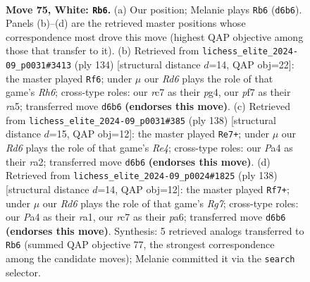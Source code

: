 \documentclass[11pt]{article}
\begin{document}
\clearpage

\begin{figure}[p]\centering
\begin{subfigure}{0.46\textwidth}\centering
\resizebox{\linewidth}{!}{%
\newchessgame
\chessboard[
  setfen={R7/2r2p2/3Rp3/6k1/P3P3/5P2/6K1/8 w - - 41 75},
  showmover=false,
  pgfstyle=straightmove, color=movearrow, markmove={d6-b6}
]}
\caption{}
\end{subfigure}\hfill
\begin{subfigure}{0.46\textwidth}\centering
\resizebox{\linewidth}{!}{%
\newchessgame
\chessboard[
  setfen={8/2k5/7R/r6p/6p1/6P1/5PK1/8 w - - 14 68},
  showmover=false,
  pgfstyle=straightmove, color=movearrow, markmove={h6-f6}
]}
\caption{}
\end{subfigure}
\\[4pt]
\begin{subfigure}{0.46\textwidth}\centering
\resizebox{\linewidth}{!}{%
\newchessgame
\chessboard[
  setfen={8/7k/8/7p/4R2P/6P1/r3pK2/8 w - - 1 70},
  showmover=false,
  pgfstyle=straightmove, color=movearrow, markmove={e4-e7}
]}
\caption{}
\end{subfigure}\hfill
\begin{subfigure}{0.46\textwidth}\centering
\resizebox{\linewidth}{!}{%
\newchessgame
\chessboard[
  setfen={8/6R1/pp6/5kp1/2PK4/7P/7P/r7 w - - 7 70},
  showmover=false,
  pgfstyle=straightmove, color=movearrow, markmove={g7-f7}
]}
\caption{}
\end{subfigure}
\caption{\textbf{Move 75, White: \texttt{Rb6}.} (a) Our position; Melanie plays \texttt{Rb6} (\texttt{d6b6}). Panels (b)--(d) are the retrieved master positions whose correspondence most drove this move (highest QAP objective among those that transfer to it). (b) Retrieved from \texttt{lichess\_elite\_2024-09\_p0031\#3413} (ply 134) [structural distance $d$=14, QAP obj=22]: the master played \texttt{Rf6}; under $\mu$ our \emph{Rd6} plays the role of that game's \emph{Rh6}; cross-type roles: our \emph{r}c7 as their \emph{p}g4, our \emph{p}f7 as their \emph{r}a5; transferred move \texttt{d6b6} \textbf{(endorses this move)}. (c) Retrieved from \texttt{lichess\_elite\_2024-09\_p0031\#385} (ply 138) [structural distance $d$=15, QAP obj=12]: the master played \texttt{Re7+}; under $\mu$ our \emph{Rd6} plays the role of that game's \emph{Re4}; cross-type roles: our \emph{P}a4 as their \emph{r}a2; transferred move \texttt{d6b6} \textbf{(endorses this move)}. (d) Retrieved from \texttt{lichess\_elite\_2024-09\_p0024\#1825} (ply 138) [structural distance $d$=14, QAP obj=12]: the master played \texttt{Rf7+}; under $\mu$ our \emph{Rd6} plays the role of that game's \emph{Rg7}; cross-type roles: our \emph{P}a4 as their \emph{r}a1, our \emph{r}c7 as their \emph{p}a6; transferred move \texttt{d6b6} \textbf{(endorses this move)}. Synthesis: 5 retrieved analogs transferred to \texttt{Rb6} (summed QAP objective 77, the strongest correspondence among the candidate moves); Melanie committed it via the \texttt{search} selector.}
\label{fig:thought-m148}
\end{figure}
\end{document}
